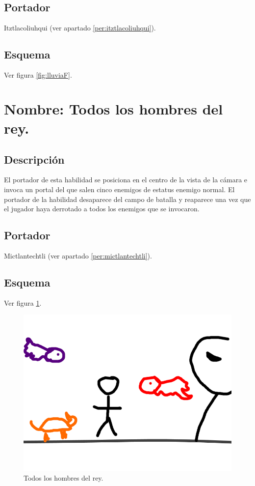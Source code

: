 \subsection{Portador}
Itztlacoliuhqui (ver apartado \ref{per:itztlacoliuhqui}).
\subsection{Esquema}
			Ver figura \ref{fig:lluviaF}.

\section{Nombre: Todos los hombres del rey.}\label{hab.TodoRey}
\subsection{Descripción}
El portador de esta habilidad se posiciona en el centro de la vista de la cámara e invoca un portal del que salen cinco enemigos de estatus enemigo normal. El portador de la habilidad desaparece del campo de batalla y reaparece una vez que el jugador haya derrotado a todos los enemigos que se invocaron.  
\subsection{Portador}
Mictlantechtli (ver apartado \ref{per:mictlantechtli}).	
\subsection{Esquema}
			Ver figura \ref{fig:rey}.
			\begin{figure}
				\centering
				\includegraphics[height=0.2 \textheight]{Imagenes/rey}
				\caption{Todos los hombres del rey.}
				\label{fig:rey}
			\end{figure}
